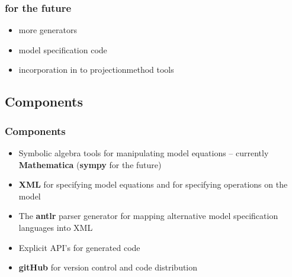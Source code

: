 \documentclass[tikz]{beamer}
\newcommand{\mma}{Mathematica}
\begin{document}
\begin{frame}
  \frametitle{for the future}
  \begin{itemize}
  \item more generators
  \item model specification code
  \item incorporation in to projectionmethod tools
  \end{itemize}
\end{frame}


\subsection{Components}
\begin{frame}
  \frametitle{Components}  

{\small
  \begin{itemize}
\item Symbolic algebra tools for manipulating model equations
 -- currently {\bf \mma}  ({\bf sympy} for the future)
\item {\bf XML} for specifying model equations and 
for specifying operations on the model
\item The {\bf antlr} parser generator for mapping alternative 
model specification languages into  XML
\item Explicit  API's for generated code
\item {\bf gitHub} for version control and code distribution
  \end{itemize}

}
\end{frame}
\end{document}
